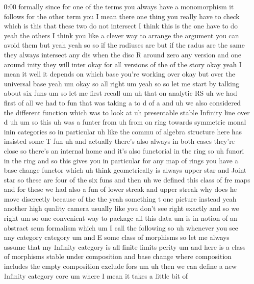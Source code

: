 \begin{unfinished}{0:00}
formally  since  for  one  of  the  terms  you
always  have  a  monomorphism  it  follows
for  the  other  term  you  I  mean  there  one
thing  you  really  have  to  check  which  is
this  that  these  two  do  not
intersect  I  think  this  is  the  one  have
to  do  yeah  the  others  I  think  you  like  a
clever  way  to  arrange  the  argument  you
can  avoid  them  but  yeah
yeah  so  so  if  the  radiuses  are  but  if
the  radus  are  the  same  they  always
intersect  any  dis  when  the  disc  R  around
zero  any  version  and  one  around  inity
they  will
inter  okay
for  all  versions  of  the  of  the  story
okay  yeah  I  mean  it  well  it  depends  on
which  base  you're  working  over  okay  but
over  the  universal  base
yeah
um  okay
so  all  right
um  yeah  so  so  let  me  start  by  talking
about  six  funs  um
so  let  me  first  recall  um  uh  that  on
analytic
RS  uh  we  had  first  of  all  we  had  to  fun
that  was  taking  a  to  d  of
a  and  uh  we  also  considered  the
different  function  which  was  to  look  at
uh  presentable  stable  Infinity  line  over
d
uh  um  so  this  uh  was  a  funter  from
uh  from  on
ring
towards  symmetric  monal  inin
categories  so  in
particular
uh  like  the  commu  of  algebra  structure
here  has  insisted  some  T  fun  uh  and
actually  there's  also  always  in  both
cases  they're  close  so  there's  an
internal
home  and  it's  also  functorial  in  the
ring  so
uh  funori  in  the  ring  and  so  this  gives
you  in  particular  for  any  map  of  rings
you  have  a  base  change  functor  which  uh
think  geometrically  is  always  upper  star
and  Joint
star
so  these  are  four  of  the  six  funs  and
then  uh  we  defined  this  class  of  fre
maps  and  for  these  we  had  also  a  fun  of
lower  streak  and  upper
streak
why  does  he  move
discreetly  because  of  the  the  yeah
something  t  one  picture  instead  yeah
another  high  quality
camera  usually  like  you  don't  see  right
exactly  and  so  we  right  um  so  one
convenient  way  to  package  all  this  data
um  is  in  notion  of  an  abstract  seun
formalism  which  um  I  call  the  following
so  uh  whenever  you  see  any
category
category  um  and  E  some  class  of
morphisms
so  let
me  always  assume  that  my  Infinity
category  is  all  finite  limits
perity  um  and  here  is  a  class  of
morphisms  stable  under  composition  and
base
change  where  composition  includes  the
empty  composition  exclude
fors
um
uh  then  we  can
define  a  new  Infinity  category
core
um  where  I  mean  it  takes  a  little  bit  of

\end{unfinished}
